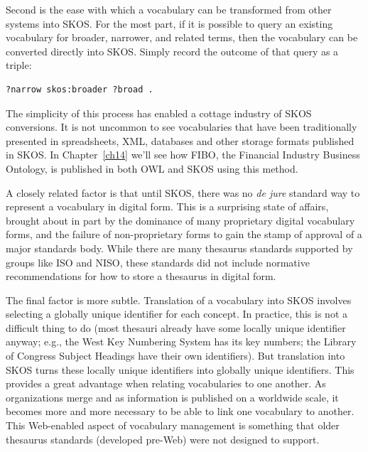 Second is the ease with which a vocabulary can be transformed from other
systems into SKOS. For the most part, if it is possible to query an
existing vocabulary for broader, narrower, and related terms, then the
vocabulary can be converted directly into SKOS. Simply record the
outcome of that query as a triple:

\begin{lstlisting}
?narrow skos:broader ?broad .
\end{lstlisting}

The simplicity of this process has enabled a cottage industry of SKOS
conversions. It is not uncommon to see vocabularies that have been
traditionally presented in spreadsheets, XML, databases and other
storage formats published in SKOS.  In Chapter~\ref{ch14} we'll see how FIBO, the Financial Industry Business Ontology, is published in both OWL and SKOS using this method. 

A closely related factor is that until SKOS, there was no \emph{de jure}
standard way to represent a vocabulary in digital form. This is a
surprising state of affairs, brought about in part by the dominance of
many proprietary digital vocabulary forms, and the failure of
non-proprietary forms to gain the stamp of approval of a major standards
body. While there are many thesaurus standards supported by groups like
ISO and NISO, these standards did not include normative recommendations
for how to store a thesaurus in digital form.

The final factor is more subtle. Translation of a vocabulary into SKOS
involves selecting a globally
unique identifier for each concept. In practice, this is not a difficult
thing to do (most thesauri already have some locally unique identifier
anyway; e.g., the West Key Numbering System has its key numbers; the
Library of Congress Subject Headings have their own identifiers). But
translation into SKOS turns these locally unique identifiers into
globally unique identifiers. This provides a great advantage when
relating vocabularies to one another. As organizations merge and as
information is published on a worldwide scale, it becomes more and more
necessary to be able to link one vocabulary to another. This Web-enabled
aspect of vocabulary management is something that older thesaurus
standards (developed pre-Web) were not designed to support.

